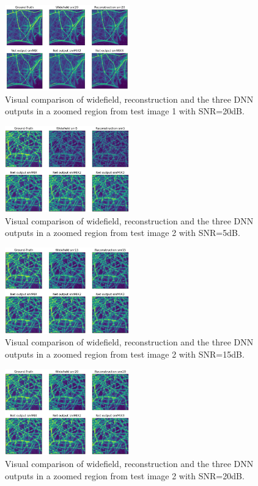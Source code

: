 \documentclass[conference]{IEEEtran}
\begin{document}
\begin{figure}[h!]
    \centering
    \includegraphics[width=0.48\textwidth]{images/test_img_4_model_comp_snr20.png}
    \caption{Visual comparison of widefield, reconstruction and the three DNN outputs in a zoomed region from test image 1 with SNR=20dB.}
    \label{fig:test_img_4_model_comp_snr29}
\end{figure}
\begin{figure}[h!]
    \centering
    \includegraphics[width=0.48\textwidth]{images/test_img_2_model_comp_snr5.png}
    \caption{Visual comparison of widefield, reconstruction and the three DNN outputs in a zoomed region from test image 2 with SNR=5dB.}
    \label{fig:test_img_2_model_comp_snr5}
\end{figure}
\begin{figure}[h!]
    \centering
    \includegraphics[width=0.48\textwidth]{images/test_img_2_model_comp_snr15.png}
    \caption{Visual comparison of widefield, reconstruction and the three DNN outputs in a zoomed region from test image 2 with SNR=15dB.}
    \label{fig:test_img_2_model_comp_snr15}
\end{figure}
\begin{figure}[h!]
    \centering
    \includegraphics[width=0.48\textwidth]{images/test_img_2_model_comp_snr20.png}
    \caption{Visual comparison of widefield, reconstruction and the three DNN outputs in a zoomed region from test image 2 with SNR=20dB.}
    \label{fig:test_img_2_model_comp_snr20}
\end{figure}
\end{document}
